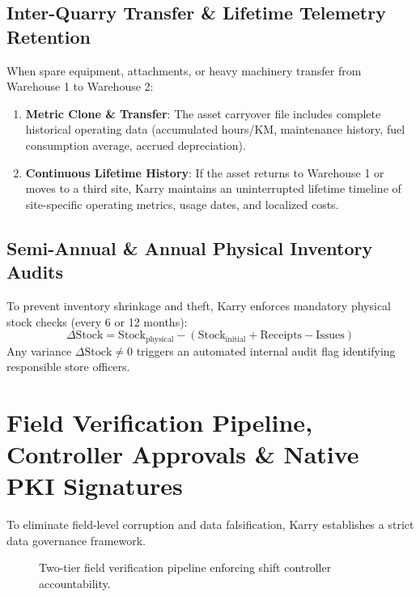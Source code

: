 \documentclass[11pt, a4paper]{article}
\begin{document}
\subsection{Inter-Quarry Transfer \& Lifetime Telemetry Retention}
When spare equipment, attachments, or heavy machinery transfer from Warehouse 1 to Warehouse 2:
\begin{enumerate}
    \item \textbf{Metric Clone \& Transfer}: The asset carryover file includes complete historical operating data (accumulated hours/KM, maintenance history, fuel consumption average, accrued depreciation).
    \item \textbf{Continuous Lifetime History}: If the asset returns to Warehouse 1 or moves to a third site, Karry maintains an uninterrupted lifetime timeline of site-specific operating metrics, usage dates, and localized costs.
\end{enumerate}

\subsection{Semi-Annual \& Annual Physical Inventory Audits}
To prevent inventory shrinkage and theft, Karry enforces mandatory physical stock checks (every 6 or 12 months):
\begin{equation}
    \Delta \text{Stock} = \text{Stock}_{\text{physical}} - \left( \text{Stock}_{\text{initial}} + \text{Receipts} - \text{Issues} \right)
\end{equation}
Any variance $\Delta \text{Stock} \neq 0$ triggers an automated internal audit flag identifying responsible store officers.

\section{Field Verification Pipeline, Controller Approvals \& Native PKI Signatures}

To eliminate field-level corruption and data falsification, Karry establishes a strict data governance framework.

\begin{figure}[htbp]
  \centering
  \caption{Two-tier field verification pipeline enforcing shift controller accountability.}
  \label{fig:approval_pipeline}
\end{figure}
\end{document}
